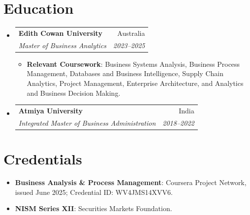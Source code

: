 \documentclass[letterpaper,9.5pt]{article}
\makeatletter
\newcommand{\resumeItem}[2]{
  \item\small{
    \textbf{#1}{: #2 \vspace{-2pt}}
  }
}
\newcommand{\resumeSubheading}[4]{
  \vspace{-1pt}\item
    \begin{tabular*}{0.97\textwidth}{l@{\extracolsep{\fill}}r}
      \textbf{#1} & #2 \\
      \textit{\small #3} & \textit{\small #4} \\
    \end{tabular*}\vspace{-5pt}
}
\newcommand{\resumeSubItem}[2]{\resumeItem{#1}{#2}\vspace{-4pt}}
\newcommand{\resumeSubHeadingListStart}{\begin{itemize}[leftmargin=*]}
\newcommand{\resumeSubHeadingListEnd}{\end{itemize}}
\newcommand{\resumeItemListStart}{\begin{itemize}}
\newcommand{\resumeItemListEnd}{\end{itemize}\vspace{-5pt}}
\makeatother
\begin{document}
\section{Education}
\resumeSubHeadingListStart
  \resumeSubheading
    {Edith Cowan University}{Australia}
    {Master of Business Analytics}{2023--2025}
    \resumeItemListStart
      \resumeItem{Relevant Coursework}
        {Business Systems Analysis, Business Process Management, Databases and Business Intelligence, Supply Chain Analytics, Project Management, Enterprise Architecture, and Analytics and Business Decision Making.}
    \resumeItemListEnd
  \resumeSubheading
    {Atmiya University}{India}
    {Integrated Master of Business Administration}{2018--2022}
\resumeSubHeadingListEnd

\section{Credentials}
\resumeSubHeadingListStart
  \resumeSubItem{Business Analysis \& Process Management}
    {Coursera Project Network, issued June 2025; Credential ID: WV4JMS14XVV6.}
  \resumeSubItem{NISM Series XII}
    {Securities Markets Foundation.}
\resumeSubHeadingListEnd
\end{document}
